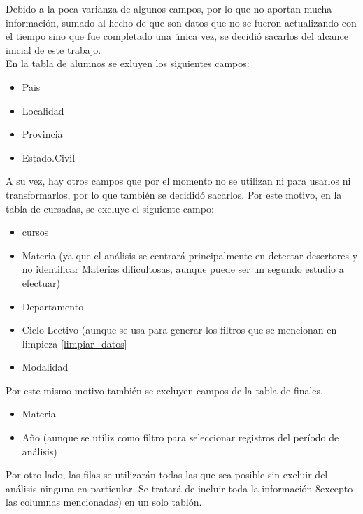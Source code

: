 
Debido a la poca varianza de algunos campos, por lo que no aportan mucha información, sumado al hecho de que son datos que no se fueron actualizando con el tiempo sino que fue completado una única vez, se decidió sacarlos del alcance inicial de este trabajo.\\

En la tabla de alumnos se exluyen los siguientes campos:
\begin{itemize}
\item Pais
\item Localidad
\item Provincia
\item Estado.Civil
\end{itemize}

A su vez, hay otros campos que por el momento no se utilizan ni para usarlos ni transformarlos, por lo que también se decididó sacarlos.
Por este motivo, en la tabla de cursadas, se excluye el siguiente campo:
\begin{itemize}
	\item cursos
	\item Materia (ya que el análisis se centrará principalmente en detectar desertores y no identificar Materias dificultosas, aunque puede ser un segundo estudio a efectuar)
	\item Departamento
	\item Ciclo Lectivo (aunque se usa para generar los filtros que se mencionan en limpieza \ref{limpiar_datos}
	\item Modalidad
\end{itemize}

Por este mismo motivo también se excluyen campos de la tabla de finales.
\begin{itemize}
	\item Materia
	\item Año (aunque se utiliz como filtro para seleccionar registros del período de análisis)
\end{itemize}

Por otro lado, las filas se utilizarán todas las que sea posible sin excluir del análisis ninguna en particular. Se tratará de incluir toda la información 8excepto las columnas mencionadas) en un solo tablón.

